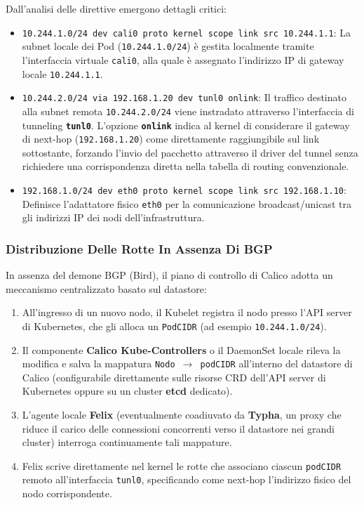 \documentclass[11pt, a4paper]{article}
\begin{document}
Dall'analisi delle direttive emergono dettagli critici:
\begin{itemize}[noitemsep]
    \item \texttt{10.244.1.0/24 dev cali0 proto kernel scope link src 10.244.1.1}: La subnet locale dei Pod (\texttt{10.244.1.0/24}) è gestita localmente tramite l'interfaccia virtuale \texttt{cali0}, alla quale è assegnato l'indirizzo IP di gateway locale \texttt{10.244.1.1}.
    \item \texttt{10.244.2.0/24 via 192.168.1.20 dev tunl0 onlink}: Il traffico destinato alla subnet remota \texttt{10.244.2.0/24} viene instradato attraverso l'interfaccia di tunneling \textbf{\texttt{tunl0}}. L'opzione \textbf{\texttt{onlink}} indica al kernel di considerare il gateway di next-hop (\texttt{192.168.1.20}) come direttamente raggiungibile sul link sottostante, forzando l'invio del pacchetto attraverso il driver del tunnel senza richiedere una corrispondenza diretta nella tabella di routing convenzionale.
    \item \texttt{192.168.1.0/24 dev eth0 proto kernel scope link src 192.168.1.10}: Definisce l'adattatore fisico \texttt{eth0} per la comunicazione broadcast/unicast tra gli indirizzi IP dei nodi dell'infrastruttura.
\end{itemize}

\subsubsection{Distribuzione Delle Rotte In Assenza Di BGP}
In assenza del demone BGP (Bird), il piano di controllo di Calico adotta un meccanismo centralizzato basato sul datastore:
\begin{enumerate}[noitemsep]
    \item All'ingresso di un nuovo nodo, il Kubelet registra il nodo presso l'API server di Kubernetes, che gli alloca un \texttt{PodCIDR} (ad esempio \texttt{10.244.1.0/24}).
    \item Il componente \textbf{Calico Kube-Controllers} o il DaemonSet locale rileva la modifica e salva la mappatura \texttt{Nodo $\to$ podCIDR} all'interno del datastore di Calico (configurabile direttamente sulle risorse CRD dell'API server di Kubernetes oppure su un cluster \textbf{etcd} dedicato).
    \item L'agente locale \textbf{Felix} (eventualmente coadiuvato da \textbf{Typha}, un proxy che riduce il carico delle connessioni concorrenti verso il datastore nei grandi cluster) interroga continuamente tali mappature.
    \item Felix scrive direttamente nel kernel le rotte che associano ciascun \texttt{podCIDR} remoto all'interfaccia \texttt{tunl0}, specificando come next-hop l'indirizzo fisico del nodo corrispondente.
\end{enumerate}
\end{document}
